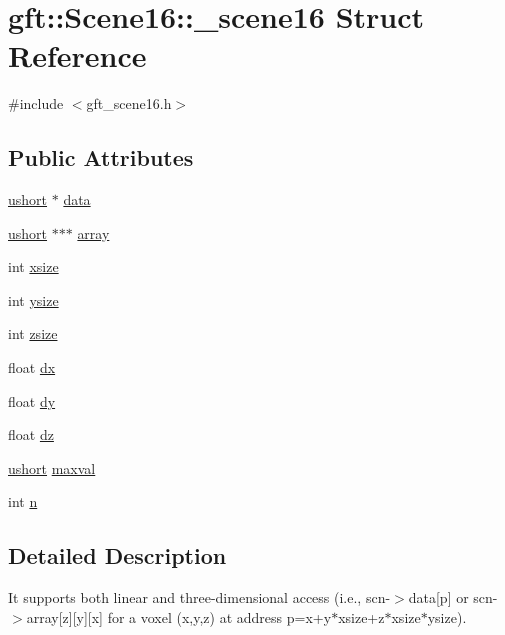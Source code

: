 \hypertarget{structgft_1_1Scene16_1_1__scene16}{}\section{gft\+:\+:Scene16\+:\+:\+\_\+scene16 Struct Reference}
\label{structgft_1_1Scene16_1_1__scene16}


{\ttfamily \#include $<$gft\+\_\+scene16.\+h$>$}

\subsection*{Public Attributes}
\begin{DoxyCompactItemize}
\item 
\hyperlink{namespacegft_a878518cf75338c097e2c8e9b10bfb00d}{ushort} $\ast$ \hyperlink{structgft_1_1Scene16_1_1__scene16_aa54beddadad842e6b065b98bd1a16174}{data}
\item 
\hyperlink{namespacegft_a878518cf75338c097e2c8e9b10bfb00d}{ushort} $\ast$$\ast$$\ast$ \hyperlink{structgft_1_1Scene16_1_1__scene16_afa6f3ebda2199854c089949345743528}{array}
\item 
int \hyperlink{structgft_1_1Scene16_1_1__scene16_a8ae57178842d43cc00ac0a943559d567}{xsize}
\item 
int \hyperlink{structgft_1_1Scene16_1_1__scene16_a074635a9101766856f9c1925650017b9}{ysize}
\item 
int \hyperlink{structgft_1_1Scene16_1_1__scene16_a23459fd3e8f2a3b1a9fd973cd9cc672c}{zsize}
\item 
float \hyperlink{structgft_1_1Scene16_1_1__scene16_a05c332589ea319aa6c83fd870cc250be}{dx}
\item 
float \hyperlink{structgft_1_1Scene16_1_1__scene16_af0f1f87d9bb5150eb04a28a074f05d9f}{dy}
\item 
float \hyperlink{structgft_1_1Scene16_1_1__scene16_a34fb531b42960b8d86c61b4c7d33f24a}{dz}
\item 
\hyperlink{namespacegft_a878518cf75338c097e2c8e9b10bfb00d}{ushort} \hyperlink{structgft_1_1Scene16_1_1__scene16_a9fc6ef1ab4186efec3a186393a261597}{maxval}
\item 
int \hyperlink{structgft_1_1Scene16_1_1__scene16_a23fdfabcf912d8c2162aaa7cc6563ae9}{n}
\end{DoxyCompactItemize}


\subsection{Detailed Description}
It supports both linear and three-\/dimensional access (i.\+e., scn-\/$>$data\mbox{[}p\mbox{]} or scn-\/$>$array\mbox{[}z\mbox{]}\mbox{[}y\mbox{]}\mbox{[}x\mbox{]} for a voxel (x,y,z) at address p=x+y$\ast$xsize+z$\ast$xsize$\ast$ysize). 

